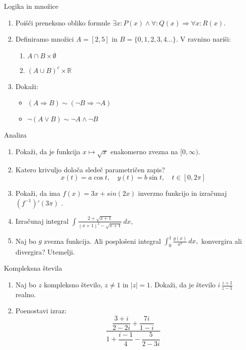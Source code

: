 \begin{frame}{Logika in množice}
	\begin{enumerate}
		\item
		Poišči preneksno obliko formule \(\exists x: P(x) \land \forall: Q(x) \Rightarrow
		\forall x: R(x).\)
		\item 
		Definiramo množici \(A=[2,5]\) in \(B=\{0,1,2,3,4\ldots\}\).
		V ravnino nariši:
		\begin{enumerate}
		   \item \(A \cap B \times \emptyset \)
		   \item \((A \cup B)^c \times \mathbb{R}\)
		\end{enumerate}
		\item
		Dokaži:
		\begin{itemize}
			\item \((A \Rightarrow B) \sim (\neg B \Rightarrow \neg A)\)
			\item \(\neg(A \lor B) \sim \neg A \land \neg B \)
		\end{itemize}
	\end{enumerate}
\end{frame}

\begin{frame}{Analiza}
	\begin{enumerate}
		\item 
		Pokaži, da je funkcija \(x \mapsto \sqrt{x} \) enakomerno zvezna na \([0,\infty)\).
		\item 
		Katero krivuljo določa sledeč parametričen zapis?
		$$
		   x(t) = a \cos t, \quad %
		   y(t) = b \sin t, \quad %
		   t \in [0, 2 \pi]
		$$ 
		\item
		Pokaži, da ima \(f(x) = 3x + sin(2x)\) inverzno funkcijo in izračunaj \((f^{-1})'(3 \pi)\) .
		
		\item
		Izračunaj integral 
		\(\displaystyle \int\frac{2+\sqrt{x+1}}{(x+1)^2-\sqrt{x+1}} \, d x,  \)
		
		\item 
		Naj bo $g$ zvezna funkcija. Ali posplošeni integral 
		\( \int_0^1 \frac{g(x)}{x^2} \, d x, \)
		konvergira ali divergira? Utemelji.
	\end{enumerate}
\end{frame}

\begin{frame}{Kompleksna števila}
	\begin{enumerate}
		\item
		Naj bo $z$ kompleksno število, $z \ne 1$ in \(\left|z\right|=1\).
		Dokaži, da je število \( i \, \frac{z+1}{z-1} \) realno.
		\item
		Poenostavi izraz:
		\[ \frac{\dfrac{3+i}{2-2i} + \dfrac{7i}{1-i}}{1+ \dfrac{i-1}{4} - \dfrac{5}{2-3i}}\]
	\end{enumerate}
\end{frame}